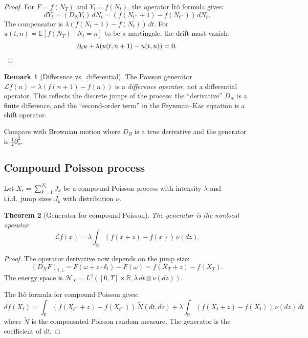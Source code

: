 \documentclass[11pt]{article}
\newtheorem{theorem}{Theorem}[section]
\theoremstyle{definition}
\newtheorem{remark}[theorem]{Remark}
\newcommand{\E}{\mathbb{E}}
\newcommand{\R}{\mathbb{R}}
\newcommand{\Hi}{\mathcal{H}}
\begin{document}
\begin{proof}
For $F = f(N_T)$ and $Y_t = f(N_t)$, the operator It\^o formula gives:
\begin{equation}
dY_t = (D_N Y_t) \, dN_t = (f(N_{t^-} + 1) - f(N_{t^-})) \, dN_t.
\end{equation}
The compensator is $\lambda(f(N_t + 1) - f(N_t)) \, dt$. For $u(t,n) = \E[f(N_T) \mid N_t = n]$ to be a martingale, the drift must vanish:
\begin{equation}
\partial_t u + \lambda(u(t, n+1) - u(t, n)) = 0. \qedhere
\end{equation}
\end{proof}

\begin{remark}[Difference vs.\ differential]
The Poisson generator $\mathcal{L}f(n) = \lambda(f(n+1) - f(n))$ is a \emph{difference operator}, not a differential operator. This reflects the discrete jumps of the process: the ``derivative'' $D_N$ is a finite difference, and the ``second-order term'' in the Feynman--Kac equation is a shift operator.

Compare with Brownian motion where $D_B$ is a true derivative and the generator is $\frac{1}{2}\partial_x^2$.
\end{remark}

\subsection{Compound Poisson process}

Let $X_t = \sum_{k=1}^{N_t} J_k$ be a compound Poisson process with intensity $\lambda$ and i.i.d.\ jump sizes $J_k$ with distribution $\nu$.

\begin{theorem}[Generator for compound Poisson]\label{thm:compound-poisson}
The generator is the nonlocal operator
\begin{equation}
\mathcal{L} f(x) = \lambda \int_{\R} (f(x + z) - f(x)) \, \nu(dz).
\end{equation}
\end{theorem}

\begin{proof}
The operator derivative now depends on the jump size:
\begin{equation}
(D_X F)_{t,z} = F(\omega + z \cdot \delta_t) - F(\omega) = f(X_T + z) - f(X_T).
\end{equation}
The energy space is $\Hi_X = L^2([0,T] \times \R, \lambda \, dt \otimes \nu(dz))$.

The It\^o formula for compound Poisson gives:
\begin{equation}
df(X_t) = \int_{\R} (f(X_{t^-} + z) - f(X_{t^-})) \, \tilde{N}(dt, dz) + \lambda \int_{\R} (f(X_t + z) - f(X_t)) \, \nu(dz) \, dt
\end{equation}
where $\tilde{N}$ is the compensated Poisson random measure. The generator is the coefficient of $dt$.
\end{proof}
\end{document}
